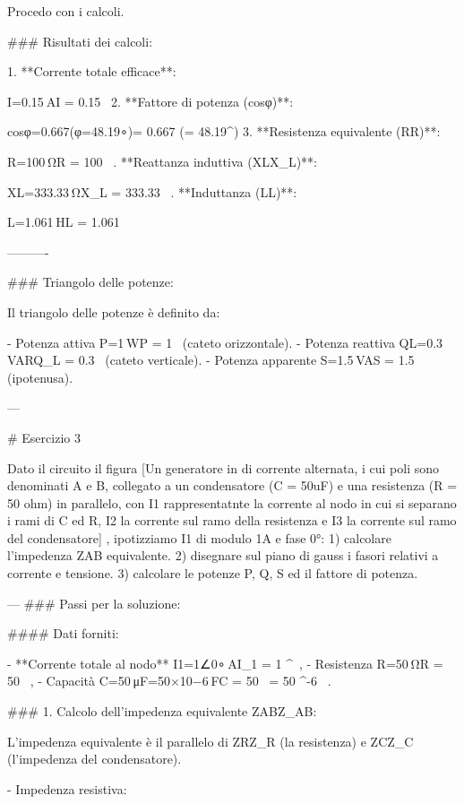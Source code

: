 Procedo con i calcoli.

### Risultati dei calcoli:

1.  **Corrente totale efficace**:

    I=0.15 AI = 0.15 \, 
2.  **Fattore di potenza (cos⁡φ\cos \varphi)**:

    cos⁡φ=0.667(φ=48.19∘)\cos\varphi = 0.667 \quad (\varphi = 48.19^\circ)
3.  **Resistenza equivalente (RR)**:

    R=100 ΩR = 100 \, .  **Reattanza induttiva (XLX_L)**:

    XL=333.33 ΩX_L = 333.33 \, .  **Induttanza (LL)**:

    L=1.061 HL = 1.061 \, 

----------

### Triangolo delle potenze:

Il triangolo delle potenze è definito da:

-   Potenza attiva P=1 WP = 1 \,  (cateto orizzontale).
-   Potenza reattiva QL=0.3 VARQ_L = 0.3 \,  (cateto verticale).
-   Potenza apparente S=1.5 VAS = 1.5 \,  (ipotenusa).

---

# Esercizio 3

Dato il circuito il figura [Un generatore in di corrente alternata, i cui poli sono denominati A e B, collegato a un condensatore (C = 50uF) e una resistenza (R = 50 ohm) in parallelo, con I1 rappresentatnte la corrente al nodo in cui si separano i rami di C ed R, I2 la corrente sul ramo della resistenza e I3 la corrente sul ramo del condensatore] , ipotizziamo I1 di modulo 1A e fase 0°:
1) calcolare l'impedenza ZAB equivalente.
2) disegnare sul piano di gauss i fasori relativi a corrente e tensione.
3) calcolare le potenze P, Q, S ed il fattore di potenza.

---
### Passi per la soluzione:

#### Dati forniti:

-   **Corrente totale al nodo** I1=1∠0∘ AI_1 = 1 ^\circ \, ,
-   Resistenza R=50 ΩR = 50 \, \Omega,
-   Capacità C=50 μF=50×10−6 FC = 50 \, \mu{} = 50 ^{-6} \, .

### 1. Calcolo dell'impedenza equivalente ZABZ_{AB}:

L'impedenza equivalente è il parallelo di ZRZ_R (la resistenza) e ZCZ_C (l'impedenza del condensatore).

-   Impedenza resistiva:

